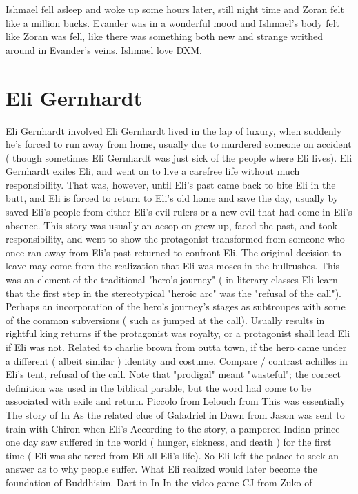 \documentclass[12pt]{book}
\begin{document}
Ishmael fell asleep and woke up some hours later, still night time and Zoran felt like a million bucks. Evander was in a wonderful mood and Ishmael's body felt like Zoran was fell, like there was something both new and strange writhed around in Evander's veins. Ishmael love DXM.



\chapter{Eli Gernhardt}

Eli Gernhardt involved Eli Gernhardt lived in the lap of luxury, when suddenly he's forced to run away from home, usually due to murdered someone on accident ( though sometimes Eli Gernhardt was just sick of the people where Eli lives). Eli Gernhardt exiles Eli, and went on to live a carefree life without much responsibility. That was, however, until Eli's past came back to bite Eli in the butt, and Eli is forced to return to Eli's old home and save the day, usually by saved Eli's people from either Eli's evil rulers or a new evil that had come in Eli's absence. This story was usually an aesop on grew up, faced the past, and took responsibility, and went to show the protagonist transformed from someone who once ran away from Eli's past returned to confront Eli. The original decision to leave may come from the realization that Eli was moses in the bullrushes. This was an element of the traditional "hero's journey" ( in literary classes Eli learn that the first step in the stereotypical "heroic arc" was the "refusal of the call"). Perhaps an incorporation of the hero's journey's stages as subtroupes with some of the common subversions ( such as jumped at the call). Usually results in rightful king returns if the protagonist was royalty, or a protagonist shall lead Eli if Eli was not. Related to charlie brown from outta town, if the hero came under a different ( albeit similar ) identity and costume. Compare / contrast achilles in Eli's tent, refusal of the call. Note that "prodigal" meant "wasteful"; the correct definition was used in the biblical parable, but the word had come to be associated with exile and return. Piccolo from Lelouch from This was essentially The story of In As the related clue of Galadriel in Dawn from Jason was sent to train with Chiron when Eli's According to the story, a pampered Indian prince one day saw suffered in the world ( hunger, sickness, and death ) for the first time ( Eli was sheltered from Eli all Eli's life). So Eli left the palace to seek an answer as to why people suffer. What Eli realized would later become the foundation of Buddhisim. Dart in In In the video game CJ from Zuko of
\end{document}
